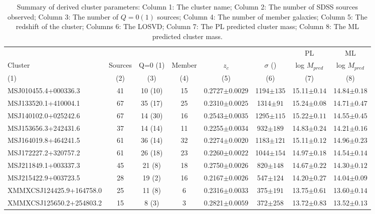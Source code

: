 \begin{landscape}
	\begin{table}
	\caption[Summary of derived cluster parameters.]{Summary of derived cluster parameters: Column 1: The cluster name; Column 2: The number of SDSS sources observed; Column 3: The number of $Q=0(1)$ sources; Column 4: The number of member galaxies; Column 5: The redshift of the cluster; Columns 6: The LOSVD; Column 7: The PL predicted cluster mass; Column 8: The ML predicted cluster mass.} 
	\begin{tabular}{lccccccc} 
		\hline 
		&&&&&& PL & ML \\
		Cluster & Sources & Q=0 (1) & Member & $z_{c}$ & $\sigma$ (\kms) & log $M_{pred}$ & log $M_{pred}$ \\
		(1) & (2) & (3) & (4) & (5) & (6) & (7) & (8) \\
		\hline \hline 
		MSJ010455.4+000336.3 & 41 & 10 (10) & 15 & 0.2727$\pm{0.0029}$ & 1194$\pm{135}$ & 15.11$\pm{0.14}$ & 14.84$\pm{0.18}$ \\
		MSJ133520.1+410004.1 & 67 & 35 (17) & 25 & 0.2310$\pm{0.0025}$ & 1314$\pm{91}$ & 15.24$\pm{0.08}$ & 14.71$\pm{0.47}$ \\
		MSJ140102.0+025242.6 & 67 & 14 (30) & 16 & 0.2543$\pm{0.0035}$ & 1295$\pm{115}$ & 15.22$\pm{0.11}$ & 14.55$\pm{0.45}$ \\
		MSJ153656.3+242431.6 & 37 & 14 (14) & 11 & 0.2255$\pm{0.0034}$ & 932$\pm{189}$ & 14.83$\pm{0.24}$ & 14.21$\pm{0.16}$ \\
		MSJ164019.8+464241.5 & 61 & 36 (14) & 32 & 0.2274$\pm{0.0020}$ & 1183$\pm{121}$ & 15.11$\pm{0.12}$ & 14.96$\pm{0.23}$ \\
		MSJ172227.2+320757.2 & 61 & 26 (18) & 23 & 0.2260$\pm{0.0022}$ & 1044$\pm{154}$ & 14.97$\pm{0.18}$ & 14.54$\pm{0.14}$ \\
		MSJ211849.1+003337.3 & 45 & 21 (8) & 18 & 0.2750$\pm{0.0026}$ & 820$\pm{148}$ & 14.67$\pm{0.22}$ & 14.30$\pm{0.12}$ \\
		MSJ215422.9+003723.5 & 28 & 19 (2) & 16 & 0.2167$\pm{0.0026}$ & 547$\pm{124}$ & 14.20$\pm{0.27}$ & 14.04$\pm{0.09}$ \\
		XMMXCSJ124425.9+164758.0 & 25 & 11 (8) & 6 & 0.2316$\pm{0.0033}$ & 375$\pm{191}$ & 13.75$\pm{0.61}$ & 13.60$\pm{0.14}$ \\
		XMMXCSJ125650.2+254803.2 & 15 & 8 (3) & 3 & 0.2821$\pm{0.0059}$ & 372$\pm{258}$ & 13.72$\pm{0.83}$ & 13.52$\pm{0.13}$ \\
		\hline 
		\end{tabular}
		\label{2tbl: derived parameters} 
	\end{table}
\end{landscape}

